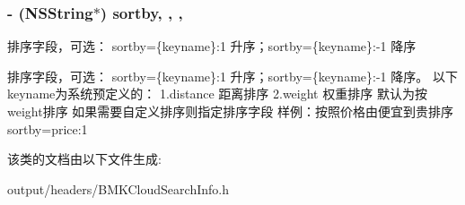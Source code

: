 \subsubsection[{sortby}]{\setlength{\rightskip}{0pt plus 5cm}-\/ (N\+S\+String$\ast$) sortby\hspace{0.3cm}{\ttfamily [read]}, {\ttfamily [write]}, {\ttfamily [nonatomic]}, {\ttfamily [strong]}}\label{interface_b_m_k_cloud_search_info_ab0d42d1b9e841c5e538e457e819a07f7}


排序字段，可选： sortby=\{keyname\}\+:1 升序；sortby=\{keyname\}\+:-\/1 降序 

排序字段，可选： sortby=\{keyname\}\+:1 升序；sortby=\{keyname\}\+:-\/1 降序。 以下keyname为系统预定义的： 1.\+distance 距离排序 2.\+weight 权重排序 默认为按weight排序 如果需要自定义排序则指定排序字段 样例：按照价格由便宜到贵排序sortby=price\+:1 

该类的文档由以下文件生成\+:\begin{DoxyCompactItemize}
\item 
output/headers/B\+M\+K\+Cloud\+Search\+Info.\+h\end{DoxyCompactItemize}

